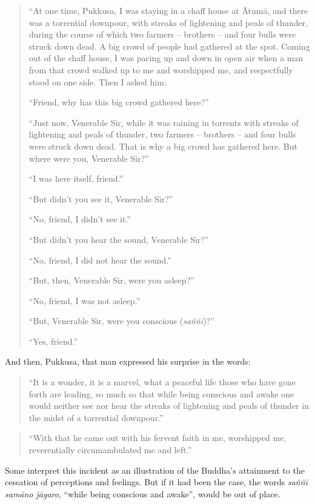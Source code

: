 \begin{quote}
``At one time, Pukkusa, I was staying in a chaff house at Ātumā, and there was a torrential downpour, with streaks of lightening and peals of thunder, during the course of which two farmers -- brothers -- and four bulls were struck down dead. A big crowd of people had gathered at the spot. Coming out of the chaff house, I was pacing up and down in open air when a man from that crowd walked up to me and worshipped me, and respectfully stood on one side. Then I asked him:

``Friend, why has this big crowd gathered here?''

``Just now, Venerable Sir, while it was raining in torrents with streaks of lightening and peals of thunder, two farmers -- brothers -- and four bulls were struck down dead. That is why a big crowd has gathered here. But where were you, Venerable Sir?''

``I was here itself, friend.''

``But didn't you see it, Venerable Sir?''

``No, friend, I didn't see it.''

``But didn't you hear the sound, Venerable Sir?''

``No, friend, I did not hear the sound.''

``But, then, Venerable Sir, were you asleep?''

``No, friend, I was not asleep.''

``But, Venerable Sir, were you conscious (\emph{saññī})?''

``Yes, friend.''
\end{quote}

And then, Pukkusa, that man expressed his surprise in the words:

\begin{quote}
``It is a wonder, it is a marvel, what a peaceful life those who have gone forth are leading, so much so that while being conscious and awake one would neither see nor hear the streaks of lightening and peals of thunder in the midst of a torrential downpour.''
\end{quote}

\begin{quote}
``With that he came out with his fervent faith in me, worshipped me, reverentially circumambulated me and left.''
\end{quote}

Some interpret this incident as an illustration of the Buddha's attainment to the cessation of perceptions and feelings. But if it had been the case, the words \emph{saññī samāno jāgaro}, ``while being conscious and awake'', would be out of place.

